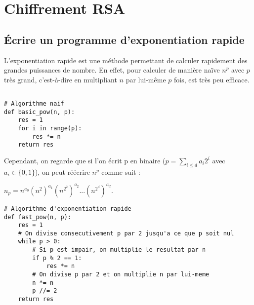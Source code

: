 \chapter{Chiffrement RSA}

\section{Écrire un programme d'exponentiation rapide}

L'exponentiation rapide est une méthode permettant de calculer rapidement des grandes puissances de nombre. En effet, pour calculer de manière naïve $n^p$ avec $p$ très grand, c'est-à-dire en multipliant $n$ par lui-même $p$ fois, est très peu efficace.



\begin{tcolorbox}[
    enhanced,
    attach boxed title to top left={xshift=6mm,yshift=-3mm},
    colback=lightgreen!20,
    colframe=lightgreen,
    colbacktitle=lightgreen,
    title=Algorithme naïf pour calculer $n^p$,
    fonttitle=\bfseries\color{black},
    boxed title style={size=small,colframe=lightgreen,sharp corners},
    sharp corners,
]
\begin{verbatim}

# Algorithme naif
def basic_pow(n, p):
    res = 1
    for i in range(p):
        res *= n
    return res
\end{verbatim}
\end{tcolorbox}

Cependant, on regarde que si l'on écrit p en binaire ($p = \sum_{i \leq d}{a_i 2^i}$ avec $a_i \in \{0,1\}$), on peut réécrire $n^p$ comme suit :

$n_p = n^{a_0} (n^2)^{a_1} (n^{2^2})^{a_2} ... (n^{2^d})^{a_d}$. \\

\begin{tcolorbox}[
    enhanced,
    attach boxed title to top left={xshift=6mm,yshift=-3mm},
    colback=lightgreen!20,
    colframe=lightgreen,
    colbacktitle=lightgreen,
    title=Algorithme d'exponentiation rapide pour calculer $n^p$,
    fonttitle=\bfseries\color{black},
    boxed title style={size=small,colframe=lightgreen,sharp corners},
    sharp corners,
]    
    \begin{verbatim}
# Algorithme d'exponentiation rapide
def fast_pow(n, p):
    res = 1
    # On divise consecutivement p par 2 jusqu'a ce que p soit nul
    while p > 0:
        # Si p est impair, on multiplie le resultat par n
        if p % 2 == 1:
            res *= n
        # On divise p par 2 et on multiplie n par lui-meme
        n *= n
        p //= 2
    return res
    \end{verbatim}
\end{tcolorbox}

